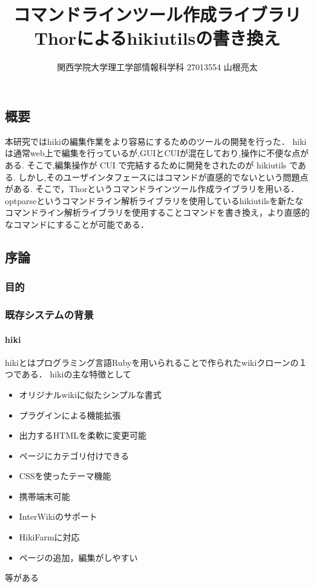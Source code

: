\documentclass[10pt,a4j]{article}
\begin{document}
\title{コマンドラインツール作成ライブラリThorによるhikiutilsの書き換え}
\author{関西学院大学理工学部情報科学科 27013554 山根亮太}
\date{}
\maketitle
\tableofcontents
\subsection{概要}
本研究ではhikiの編集作業をより容易にするためのツールの開発を行った． 
hikiは通常web上で編集を行っているが,GUIとCUIが混在しており,操作に不便な点がある. 
そこで,編集操作が CUI で完結するために開発をされたのが hikiutils である. 
しかし,そのユーザインタフェースにはコマンドが直感的でないという問題点がある. 
そこで，Thorというコマンドラインツール作成ライブラリを用いる．
optparseというコマンドライン解析ライブラリを使用しているhikiutilsを新たなコマンドライン解析ライブラリを使用することコマンドを書き換え，より直感的なコマンドにすることが可能である．

\subsection{序論}
\subsubsection{目的}
\subsubsection{既存システムの背景}
\paragraph{hiki}
hikiとはプログラミング言語Rubyを用いられることで作られたwikiクローンの１つである．
hikiの主な特徴として

\begin{itemize}
\item オリジナルwikiに似たシンプルな書式
\item プラグインによる機能拡張
\item 出力するHTMLを柔軟に変更可能
\item ページにカテゴリ付けできる
\item CSSを使ったテーマ機能
\item 携帯端末可能
\item InterWikiのサポート
\item HikiFarmに対応
\item ページの追加，編集がしやすい
\end{itemize}
等がある
\end{document}
